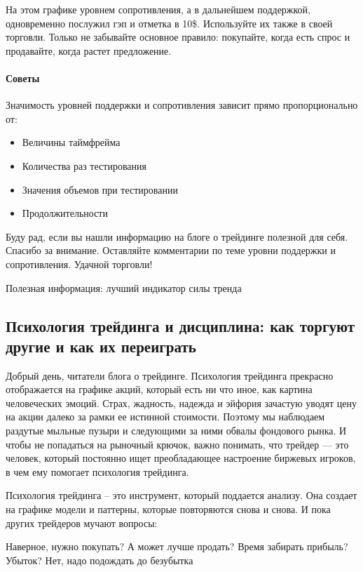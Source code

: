 \documentclass{book}
\begin{document}
На этом графике уровнем сопротивления, а в дальнейшем поддержкой,
одновременно послужил гэп и отметка в 10\$. Используйте их также в
своей торговли. Только не забывайте основное правило: покупайте, когда
есть спрос и продавайте, когда растет предложение.

\paragraph{Советы}

Значимость уровней поддержки и сопротивления зависит прямо пропорционально от:
\begin{itemize}
\item     Величины таймфрейма
\item     Количества раз тестирования
\item     Значения объемов при тестировании
\item     Продолжительности
\end{itemize}

Буду рад, если вы нашли информацию на блоге о трейдинге полезной для себя. Спасибо за внимание. Оставляйте комментарии по теме уровни поддержки и сопротивления. Удачной торговли!

Полезная информация: лучший индикатор силы тренда

\subsection{Психология трейдинга и дисциплина: как торгуют другие и
  как их переиграть}

Добрый день, читатели блога о трейдинге. Психология трейдинга прекрасно отображается на графике акций, который есть ни что иное, как картина человеческих эмоций. Страх, жадность, надежда и эйфория зачастую уводят цену на акции далеко за рамки ее истинной стоимости. Поэтому мы наблюдаем раздутые мыльные пузыри и следующими за ними обвалы фондового рынка. И чтобы не попадаться на рыночный крючок, важно понимать, что трейдер — это человек, который постоянно ищет преобладающее настроение биржевых игроков, в чем ему помогает психология трейдинга.

Психология трейдинга – это инструмент, который поддается анализу. Она создает на графике модели и паттерны, которые повторяются снова и снова. И пока других трейдеров мучают вопросы:

    Наверное, нужно покупать?
    А может лучше продать?
    Время забирать прибыль?
    Убыток? Нет, надо подождать до безубытка
\end{document}
